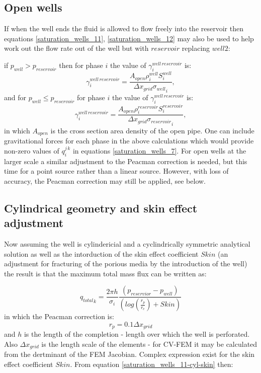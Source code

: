 \subsection{Open wells} 
\label{Mass flow rate between wells}
If when the well ends the fluid is allowed to flow freely into the reservoir 
then equations \ref{saturation_wells_11}, \ref{saturation_wells_12}  
may also be used to help work out the flow rate out of the well but with $reservoir$ replacing $well2$: 

\par\noindent
if $p_{well}>p_{reservoir}$ then for phase $i$ the value of $\gamma_i^{well\, reservoir}$ is: 
\begin{equation}
\gamma_{i}^{well\, reservoir}=\frac{ A_{open}  \rho_i^{well} S_i^{well} }{{{\Delta x}_{grid}\sigma_{well}}_i} ,
\label{saturation_wells_11}
\end{equation}
and for $p_{well}\leq p_{reservoir}$ for phase $i$ the value of $\gamma_i^{well\, reservoir}$ is:
\begin{equation}
\gamma_{i}^{well\, reservoir}=\frac{ A_{open}  \rho_i^{reservoir} S_i^{reservoir} }{{{\Delta x}_{grid}\sigma_{reservoir}}_i} ,
\label{saturation_wells_15-well10reservoir}
\end{equation}
in which $A_{open}$ is the cross section area density of the open pipe. One can include  
gravitational forces for each phase in the above calculations which would provide non-zero values 
of $q_i^{j\,k}$ in equations \ref{saturation_wells_7}. 
For open wells at the larger scale a similar adjustment to the   
Peacman correction is needed, but this time for a point source rather than a linear source. 
However, with loss of accuracy, the Peacman correction may still be applied, see below. 




\subsection{Cylindrical geometry and skin effect adjustment} 

Now assuming the well is cylindericial and a cyclindrically symmetric analytical solution 
as well as the intorduction of the skin effect coefficient $Skin$ (an adjustment for fracturing of the porious media by the introduction of the well) the result is that the maximum total mass flux can 
be written as: 

\begin{equation}
{q_{total}}_k = \frac{2 \pi h}{\sigma_i} \frac{(p_{reservior}- p_{well})}{ ( log(\frac{r_p}{r_e}) + Skin)} 
\label{saturation_wells_11-cyl-skin}
\end{equation}
in which the Peacman correction is:
\begin{equation}
r_p= 0.1 \Delta x_{grid} 
\end{equation}
and $h$ is the length of the completion - length over which the well is perforated. Also $\Delta x_{grid}$ 
is  the length scale of the elements - for CV-FEM it may be calculated from the dertminant of the FEM Jacobian. 
Complex expression exist for the skin effect coefficient $Skin$. 
From equation \ref{saturation_wells_11-cyl-skin} then:

